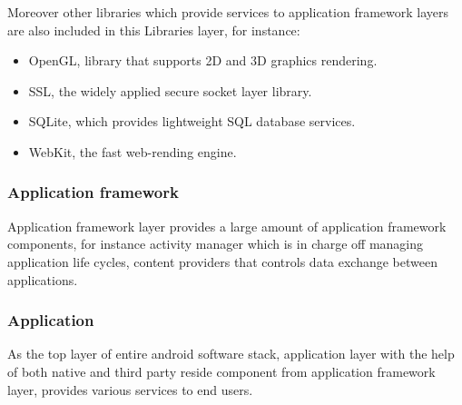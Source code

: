 Moreover other libraries which provide services to application framework layers are also included in this Libraries layer, for instance:
\begin{itemize}
\item OpenGL, library that supports 2D and 3D graphics rendering.
\item SSL, the widely applied secure socket layer library.
\item  SQLite, which provides lightweight SQL database services.
\item  WebKit, the fast  web-rending engine.
\end{itemize}
\subsubsection{Application  framework} Application framework layer provides a large amount of application framework components, for instance activity manager which is in charge off managing application life cycles, content providers that controls data exchange between applications.
\subsubsection{Application}As the top layer of entire android software stack, application layer with the help of both native and third party reside component from application framework layer, provides various services to end users.

